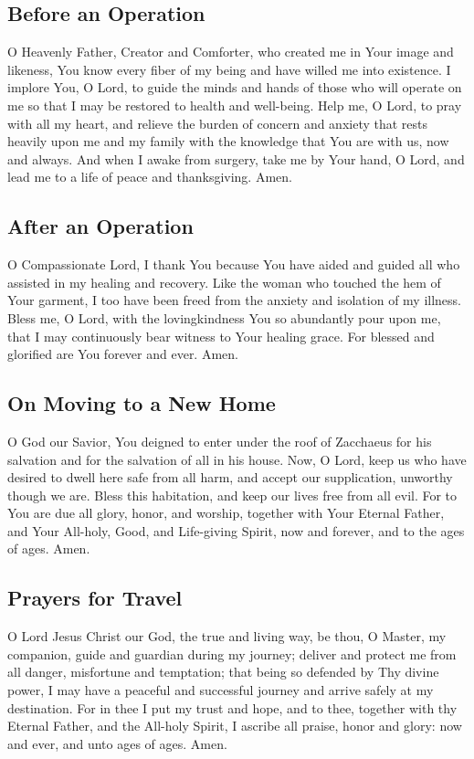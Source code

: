 \subsection{Before an Operation}

O Heavenly Father, Creator and Comforter, who created me in Your image and likeness, You know every fiber of my being and have willed me into existence. I implore You, O Lord, to guide the minds and hands of those who will operate on me so that I may be restored to health and well-being. Help me, O Lord, to pray with all my heart, and relieve the burden of concern and anxiety that rests heavily upon me and my family with the knowledge that You are with us, now and always. And when I awake from surgery, take me by Your hand, O Lord, and lead me to a life of peace and thanksgiving. Amen.

\subsection{After an Operation}

O Compassionate Lord, I thank You because You have aided and guided all who assisted in my healing and recovery. Like the woman who touched the hem of Your garment, I too have been freed from the anxiety and isolation of my illness. Bless me, O Lord, with the lovingkindness You so abundantly pour upon me, that I may continuously bear witness to Your healing grace. For blessed and glorified are You forever and ever. Amen.

\subsection{On Moving to a New Home}

O God our Savior, You deigned to enter under the roof of Zacchaeus for his salvation and for the salvation of all in his house. Now, O Lord, keep us who have desired to dwell here safe from all harm, and accept our supplication, unworthy though we are. Bless this habitation, and keep our lives free from all evil. For to You are due all glory, honor, and worship, together with Your Eternal Father, and Your All-holy, Good, and Life-giving Spirit, now and forever, and to the ages of ages. Amen.

\subsection{Prayers for Travel}

O Lord Jesus Christ our God, the true and living way, be thou, O Master, my companion, guide and guardian during my journey; deliver and protect me from all danger, misfortune and temptation; that being so defended by Thy divine power, I may have a peaceful and successful journey and arrive safely at my destination. For in thee I put my trust and hope, and to thee, together with thy Eternal Father, and the All-holy Spirit, I ascribe all praise, honor and glory: now and ever, and unto ages of ages. Amen.

